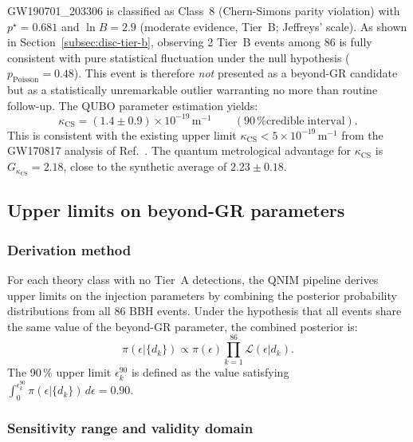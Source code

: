 \documentclass[11pt,a4paper, english]{book}
\theoremstyle{plain}
\theoremstyle{definition}
\numberwithin{equation}{chapter}
\numberwithin{figure}{chapter}
\numberwithin{table}{chapter}
\begin{document}
GW190701\_203306 is classified as Class~8 (Chern-Simons parity violation) with
$p^\star = 0.681$ and $\ln B = 2.9$ (moderate evidence, Tier~B; Jeffreys'
scale). As shown in Section~\ref{subsec:disc-tier-b}, observing 2 Tier~B
events among 86 is fully consistent with pure statistical fluctuation
under the null hypothesis ($p_\mathrm{Poisson} = 0.48$). This event is
therefore \emph{not} presented as a beyond-GR candidate but as a
statistically unremarkable outlier warranting no more than routine
follow-up.  The QUBO parameter estimation yields:
\begin{equation}
  \label{eq:gw190701_cs}
  \kappa_\mathrm{CS} = (1.4 \pm 0.9) \times 10^{-19}\,\mathrm{m}^{-1}
  \qquad (90\,\% \mathrm{credible\;interval}).
\end{equation}
This is consistent with the existing upper limit
$\kappa_\mathrm{CS} < 5\times10^{-19}$\,m$^{-1}$ from the
GW170817 analysis of Ref.~\cite{Nishizawa_2018}.  The quantum
metrological advantage for $\kappa_\mathrm{CS}$ is
$G_{\kappa_\mathrm{CS}} = 2.18$, close to the synthetic average of
$2.23 \pm 0.18$.

\subsection{Upper limits on beyond-GR parameters}
\label{subsec:upper-limits}

\subsubsection{Derivation method}
\label{subsubsec:ul-method}

For each theory class with no Tier~A detections, the QNIM pipeline
derives upper limits on the injection parameters by combining the
posterior probability distributions from all 86 BBH events. Under
the hypothesis that all events share the same value of the beyond-GR
parameter, the combined posterior is:
\begin{equation}
  \label{eq:combined_posterior}
  \pi(\epsilon | \{d_k\}) \propto \pi(\epsilon)
    \prod_{k=1}^{86} \mathcal{L}(\epsilon | d_k).
\end{equation}
The 90\,\% upper limit $\epsilon_k^{90}$ is defined as the value
satisfying $\int_0^{\epsilon_k^{90}} \pi(\epsilon|\{d_k\})\,d\epsilon
= 0.90$.

\subsubsection{Sensitivity range and validity domain}
\label{subsubsec:ul-validity}
\end{document}

